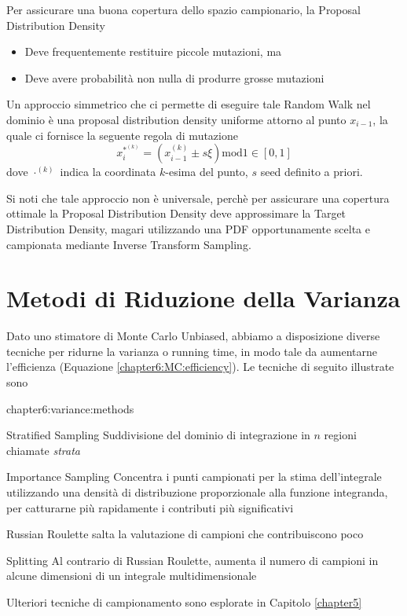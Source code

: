 Per assicurare una buona copertura dello spazio campionario, la Proposal Distribution Density
\begin{itemize}[topsep=0pt,noitemsep]
	\item Deve frequentemente restituire piccole mutazioni, ma
	\item Deve avere probabilit\`a non nulla di produrre grosse mutazioni\footnotemark{}
\end{itemize}
Un approccio simmetrico che ci permette di eseguire tale Random Walk nel dominio \`e una proposal distribution density uniforme attorno al punto 
$x_{i-1}$, la quale ci fornisce la seguente regola di mutazione
\begin{equation}
	x_i^{*^(k)}=\left(x_{i-1}^{(k)}\pm s\xi\right)\mathrm{mod}1\in[0,1]
\end{equation}
dove $\cdot^{(k)}$ indica la coordinata $k$-esima del punto, $s$ seed definito a priori.\par
Si noti che tale approccio non \`e universale, perch\`e per assicurare una copertura ottimale la Proposal Distribution Density deve approssimare 
la Target Distribution Density, magari utilizzando una PDF opportunamente scelta e campionata mediante Inverse Transform Sampling.
\section{Metodi di Riduzione della Varianza}
Dato uno stimatore di Monte Carlo Unbiased, abbiamo a disposizione diverse tecniche per ridurne la varianza o running time, in modo tale da aumentarne 
l'efficienza (Equazione \ref{chapter6:MC:efficiency}). Le tecniche di seguito illustrate sono
\begin{altDescription}{chapter6:variance:methods}
	\item[Stratified Sampling] Suddivisione del dominio di integrazione in $n$ regioni chiamate \textit{strata}
	\item[Importance Sampling] Concentra i punti campionati per la stima dell'integrale utilizzando una densit\`a di distribuzione proporzionale alla 
		funzione integranda, per catturarne pi\`u rapidamente i contributi pi\`u significativi
	\item[Russian Roulette] salta la valutazione di campioni che contribuiscono poco
	\item[Splitting] Al contrario di Russian Roulette, aumenta il numero di campioni in alcune dimensioni di un integrale multidimensionale
\end{altDescription}
Ulteriori tecniche di campionamento sono esplorate in Capitolo \ref{chapter5}
